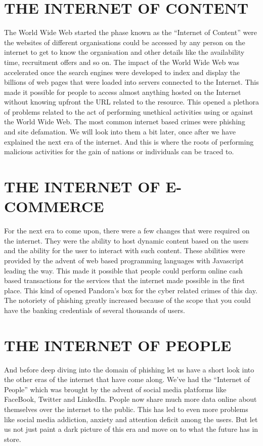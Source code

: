 \section{THE INTERNET OF CONTENT}
The World Wide Web started the phase known as the “Internet of Content” were the websites of different organisations could be accessed by any person on the internet to get to know the organisation and other details like the availability time, recruitment offers and so on. The impact of the World Wide Web was accelerated once the search engines were developed to index and display the billions of web pages that were loaded into servers connected to the Internet. This made it possible for people to access almost anything hosted on the Internet without knowing upfront the URL related to the resource. This opened a plethora of problems related to the act of performing unethical activities using or against the World Wide Web. The most common internet based crimes were phishing and site defamation. We will look into them a bit later, once after we have explained the next era of the internet. And this is where the roots of performing malicious activities for the gain of nations or individuals can be traced to.

\section{THE INTERNET OF E-COMMERCE}
For the next era to come upon, there were a few changes that were required on the internet. They were the ability to host dynamic content based on the users and the ability for the user to interact with such content. These abilities were provided by the advent of web based programming languages with Javascript leading the way. This made it possible that people could perform online cash based transactions for the services that the internet made possible in the first place. This kind of opened Pandora's box for the cyber related crimes of this day. The notoriety of phishing greatly increased because of the scope that you could have the banking credentials of several thousands of users.

\section{THE INTERNET OF PEOPLE}
And before deep diving into the domain of phishing let us have a short look into the other eras of the internet that have come along. We’ve had the “Internet of People” which was brought by the advent of social media platforms like FaceBook, Twitter and LinkedIn. People now share much more data online about themselves over the internet to the public. This has led to even more problems like social media addiction, anxiety and attention deficit among the users. But let us not just paint a dark picture of this era and move on to what the future has in store.

